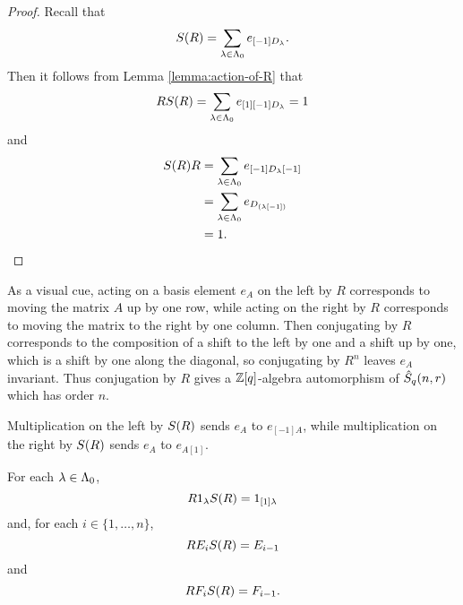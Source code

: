 \documentclass[a4paper, 11pt]{report}
\begin{document}
\begin{proof}
Recall that
\begin{equation*}
S{(R)} = \sum_{\lambda\in\Lambda_0{}} e_{[-1]D_\lambda}.
\end{equation*}
Then it follows from Lemma \ref{lemma:action-of-R} that
\begin{equation*}
RS{(R)} = \sum_{\lambda\in\Lambda_0{}}e_{[1][-1]D_\lambda} = 1
\end{equation*}
and
\begin{align*}
S{(R)} R
&= \sum_{\lambda\in\Lambda_0{}} e_{[-1]D_\lambda[-1]}\\
&= \sum_{\lambda\in\Lambda_0{}} e_{D_{(\lambda[-1])}}\\
&= 1.
\end{align*}
\end{proof}

As a visual cue, acting on a basis element $e_A$ on the left by $R$ corresponds to moving the matrix $A$ up by one row, while acting on the right by $R$ corresponds to moving the matrix to the right by one column. Then conjugating by $R$ corresponds to the composition of a shift to the left by one and a shift up by one, which is a shift by one along the diagonal, so conjugating by $R^n$ leaves $e_A$ invariant. Thus conjugation by $R$ gives a $\mathbb{Z}[q]$-algebra automorphism of $\hat{S}_q(n,r)$ which has order $n$.

Multiplication on the left by $S{(R)}$ sends $e_A$ to $e_{[-1]A}$, while multiplication on the right by $S{(R)}$ sends $e_A$ to $e_{A[1]}$.

\begin{lemma}\label{lemma:conjugation-by-R}
For each $\lambda\in\Lambda_0{}$,
\begin{equation*}
R 1_\lambda S{(R)} = 1_{[1]\lambda}
\end{equation*}
and, for each $i\in\{1,\ldots,n\}$,
\begin{equation*}
R E_i S{(R)} = E_{i-1}
\end{equation*}
and
\begin{equation*}
R F_i S{(R)} = F_{i-1}.
\end{equation*}
\end{lemma}
\end{document}
